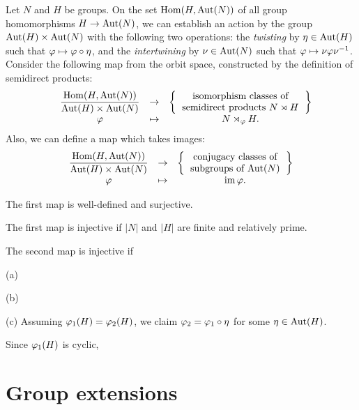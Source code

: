 \documentclass{../../large}
\begin{document}
\begin{prb}
Let $N$ and $H$ be groups.
On the set $\operatorname{Hom}(H,\operatorname{Aut}(N))$ of all group homomorphisms $H\to\operatorname{Aut}(N)$, we can establish an action by the group $\operatorname{Aut}(H)\times\operatorname{Aut}(N)$ with the following two operations:
the \emph{twisting} by $\eta\in\operatorname{Aut}(H)$ such that $\varphi\mapsto\varphi\circ\eta$, and the \emph{intertwining} by $\nu\in\operatorname{Aut}(N)$ such that $\varphi\mapsto\nu\varphi\nu^{-1}$.
Consider the following map from the orbit space, constructed by the definition of semidirect products:
\[\begin{array}{cccc}
&\dfrac{\Hom(H,\Aut(N))}{\Aut(H)\times\Aut(N)}
&\to&
\left\{\begin{tabular}{c}isomorphism classes of\\semidirect products $N\rtimes H$\end{tabular}\right\}\\
&\f&\mapsto&N\rtimes_\f H.
\end{array}\]
Also, we can define a map which takes images:
\[\begin{array}{ccc}
\dfrac{\Hom(H,\Aut(N))}{\Aut(H)\times\Aut(N)}
&\to&
\left\{\begin{tabular}{c}conjugacy classes of\\subgroups of $\Aut(N)$\end{tabular}\right\}\\
\f&\mapsto&\im\f.
\end{array}\]
\begin{parts}
\item The first map is well-defined and surjective.
\item The first map is injective if $|N|$ and $|H|$ are finite and relatively prime.
\item The second map is injective if
\end{parts}
\end{prb}
\begin{pf}
(a)

(b)

(c)
Assuming $\varphi_1(H)=\varphi_2(H)$, we claim $\varphi_2=\varphi_1\circ\eta$ for some $\eta\in\operatorname{Aut}(H)$.

Since $\varphi_1(H)$ is cyclic, 
\end{pf}



\section{Group extensions}
\end{document}
